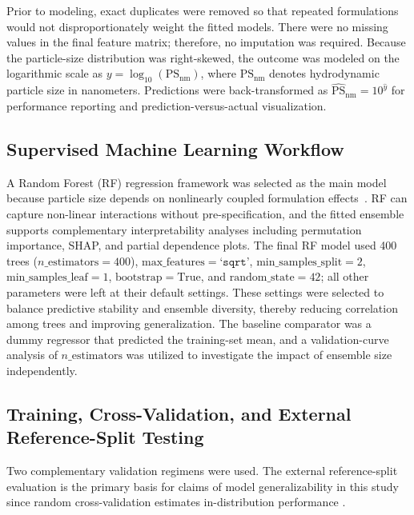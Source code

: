 \documentclass[10pt]{NSP1}
\begin{document}
Prior to modeling, exact duplicates were removed so that repeated formulations would not
disproportionately weight the fitted models. There were no missing values in the final feature
matrix; therefore, no imputation was required. Because the particle-size distribution was
right-skewed, the outcome was modeled on the logarithmic scale as $y = \log_{10}(\mathrm{PS_{nm}})$,
where $\mathrm{PS_{nm}}$ denotes hydrodynamic particle size in nanometers. Predictions were
back-transformed as $\widehat{\mathrm{PS}}_{\mathrm{nm}} = 10^{\hat{y}}$ for performance reporting
and prediction-versus-actual visualization.

\subsection{Supervised Machine Learning Workflow}

A Random Forest (RF) regression framework was selected as the main model because particle size
depends on nonlinearly coupled formulation effects~\cite{ref27,ref28,ref29}. RF can capture
non-linear interactions without pre-specification, and the fitted ensemble supports complementary
interpretability analyses including permutation importance, SHAP, and partial dependence plots.
The final RF model used 400 trees ($n\_\mathrm{estimators} = 400$), $\mathrm{max\_features} =
\texttt{`sqrt'}$, $\mathrm{min\_samples\_split} = 2$, $\mathrm{min\_samples\_leaf} = 1$,
$\mathrm{bootstrap} = \mathrm{True}$, and $\mathrm{random\_state} = 42$; all other parameters
were left at their default settings. These settings were selected to balance predictive stability
and ensemble diversity, thereby reducing correlation among trees and improving generalization. The
baseline comparator was a dummy regressor that predicted the training-set mean, and a
validation-curve analysis of $n\_\mathrm{estimators}$ was utilized to investigate the impact of
ensemble size independently.

\subsection{Training, Cross-Validation, and External Reference-Split Testing}

Two complementary validation regimens were used. The external reference-split evaluation is the
primary basis for claims of model generalizability in this study since random cross-validation
estimates in-distribution performance \cite{ref30,ref31}.
\end{document}
